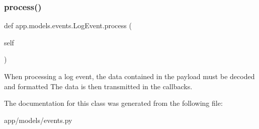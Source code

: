 \subsubsection{\texorpdfstring{process()}{process()}}
{\footnotesize\ttfamily def app.\+models.\+events.\+Log\+Event.\+process (\begin{DoxyParamCaption}\item[{}]{self }\end{DoxyParamCaption})}

\begin{DoxyVerb}When processing a log event, the data contained in the payload must be decoded and formatted
The data is then transmitted in the callbacks.
\end{DoxyVerb}
 

The documentation for this class was generated from the following file\+:\begin{DoxyCompactItemize}
\item 
app/models/events.\+py\end{DoxyCompactItemize}
